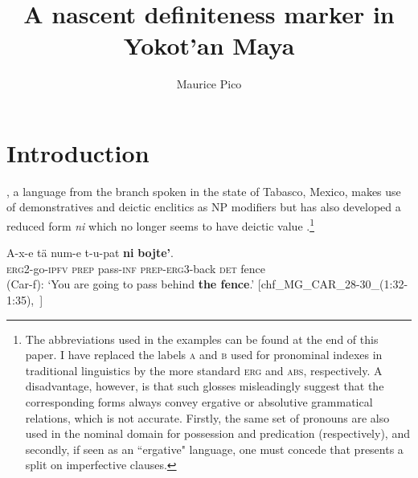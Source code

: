 \documentclass[output=paper
,modfonts
,nonflat]{langsci/langscibook}
\author{Maurice Pico\affiliation{Leiden University}}
\title{A nascent definiteness marker in Yokot'an Maya}
\begin{document}
\maketitle

\section{Introduction}\label{sec:pico:1}

, a  language from the  branch spoken in the state of Tabasco, Mexico, makes use of demonstratives and deictic enclitics as NP modifiers but has also developed a reduced form \textit{ni} which no longer seems to have deictic value .\footnote{The abbreviations used in the examples can be found at the end of this paper. I have replaced the labels \textsc{a} and \textsc{b} used for pronominal indexes in traditional  linguistics by the more standard \textsc{erg} and \textsc{abs}, respectively. A disadvantage, however, is that such glosses misleadingly suggest that the corresponding forms always convey ergative or absolutive grammatical relations, which is not accurate. Firstly, the same set of pronouns are also used in the nominal domain for possession and predication (respectively), and secondly, if seen as an ``ergative" language, one must concede that  presents a split on imperfective clauses. }

\ea \label{ex:pico:1}
\gll A-x-e tä num-e t-u-pat \textbf{ni} \textbf{bojte'}.\\
\textsc{erg2}-go-\textsc{ipfv} \textsc{prep} pass-\textsc{inf} \textsc{prep}-\textsc{erg3}-back \textsc{det} fence\\
\glt (Car-f): `You are going to pass behind \textbf{the fence}.' [chf\_MG\_CAR\_28-30\_(1:32-1:35),~\citealt{Delgado-Galvan2018archive}]
\z
\end{document}
